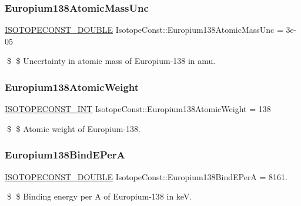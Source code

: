 \subsubsection{\texorpdfstring{Europium138\+Atomic\+Mass\+Unc}{Europium138AtomicMassUnc}}
{\footnotesize\ttfamily \mbox{\hyperlink{group___isotope_const-_macros_ga8f45a7272ce02c0b4c65c44636ed719a}{I\+S\+O\+T\+O\+P\+E\+C\+O\+N\+S\+T\+\_\+\+D\+O\+U\+B\+LE}} Isotope\+Const\+::\+Europium138\+Atomic\+Mass\+Unc = 3e-\/05}

\$ \$ Uncertainty in atomic mass of Europium-\/138 in amu. \mbox{\label{group___isotope_const-_europium-_eu138_ga22f280d0ad2356e252e6a94bbd6aecdf}} 
\subsubsection{\texorpdfstring{Europium138\+Atomic\+Weight}{Europium138AtomicWeight}}
{\footnotesize\ttfamily \mbox{\hyperlink{group___isotope_const-_macros_ga5f18360b3e99483a35c32d789e62621c}{I\+S\+O\+T\+O\+P\+E\+C\+O\+N\+S\+T\+\_\+\+I\+NT}} Isotope\+Const\+::\+Europium138\+Atomic\+Weight = 138}

\$ \$ Atomic weight of Europium-\/138. \mbox{\label{group___isotope_const-_europium-_eu138_ga4b2cd708999bb5f469da507dfcba7725}} 
\subsubsection{\texorpdfstring{Europium138\+Bind\+E\+PerA}{Europium138BindEPerA}}
{\footnotesize\ttfamily \mbox{\hyperlink{group___isotope_const-_macros_ga8f45a7272ce02c0b4c65c44636ed719a}{I\+S\+O\+T\+O\+P\+E\+C\+O\+N\+S\+T\+\_\+\+D\+O\+U\+B\+LE}} Isotope\+Const\+::\+Europium138\+Bind\+E\+PerA = 8161.}

\$ \$ Binding energy per A of Europium-\/138 in keV. \mbox{\label{group___isotope_const-_europium-_eu138_gac5f5f228ecd3d097109cca7c4d04222b}} 
